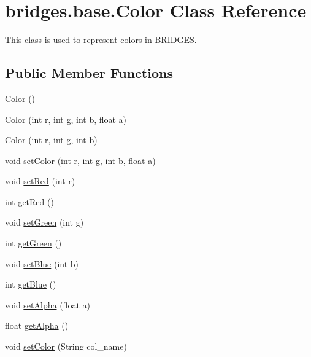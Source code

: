\hypertarget{classbridges_1_1base_1_1_color}{}\section{bridges.\+base.\+Color Class Reference}
\label{classbridges_1_1base_1_1_color}


This class is used to represent colors in B\+R\+I\+D\+G\+ES.  


\subsection*{Public Member Functions}
\begin{DoxyCompactItemize}
\item 
\hyperlink{classbridges_1_1base_1_1_color_ab6d71ac2ee1430fb2db2fbe34e692de8}{Color} ()
\item 
\hyperlink{classbridges_1_1base_1_1_color_a15f56590ca3c9cc161c7bfa47060ad21}{Color} (int r, int g, int b, float a)
\item 
\hyperlink{classbridges_1_1base_1_1_color_a5fab564fa4eec8bece64f847ebd42948}{Color} (int r, int g, int b)
\item 
void \hyperlink{classbridges_1_1base_1_1_color_a5559b1c7eb4c3901526b1012029b528f}{set\+Color} (int r, int g, int b, float a)
\item 
void \hyperlink{classbridges_1_1base_1_1_color_a1d78967703924b709e76def5b2b3ee9a}{set\+Red} (int r)
\item 
int \hyperlink{classbridges_1_1base_1_1_color_af1a30dc925b35d6bfe609f8838651025}{get\+Red} ()
\item 
void \hyperlink{classbridges_1_1base_1_1_color_a415a28133ade4e216c02ecdfc8a32a1d}{set\+Green} (int g)
\item 
int \hyperlink{classbridges_1_1base_1_1_color_a8f3fdd23cf785704faa2e3701e25978f}{get\+Green} ()
\item 
void \hyperlink{classbridges_1_1base_1_1_color_a0e04156b1573cf8002c4d9cb69825657}{set\+Blue} (int b)
\item 
int \hyperlink{classbridges_1_1base_1_1_color_ad4b82e1eb9ff59857d2868edd8d4ce65}{get\+Blue} ()
\item 
void \hyperlink{classbridges_1_1base_1_1_color_afab07ce64efa1fa5797795670b0effb6}{set\+Alpha} (float a)
\item 
float \hyperlink{classbridges_1_1base_1_1_color_a7c4247e31ecd8fcc61ef208d5deefe68}{get\+Alpha} ()
\item 
void \hyperlink{classbridges_1_1base_1_1_color_a54dcd31227bde0f5d0a4f5d3b5a24ed2}{set\+Color} (String col\+\_\+name)
\end{DoxyCompactItemize}



